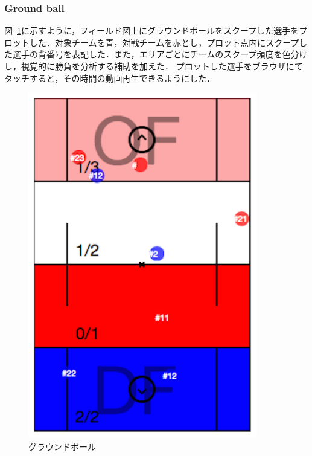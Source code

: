 \documentclass[sotsuron]{kuee}
\begin{document}
			\subsubsection{Ground ball}
				図~\ref{fig:gb}に示すように，フィールド図上にグラウンドボールをスクープした選手をプロットした．対象チームを青，対戦チームを赤とし，プロット点内にスクープした選手の背番号を表記した．また，エリアごとにチームのスクープ頻度を色分けし，視覚的に勝負を分析する補助を加えた．
				プロットした選手をブラウザにてタッチすると，その時間の動画再生できるようにした．
					\begin{figure}
						\begin{center}
							\includegraphics[width=10cm]{./png/gb.png}
						\end{center}
						\caption{グラウンドボール}
				  		\label{fig:gb}
					\end{figure}
\end{document}
